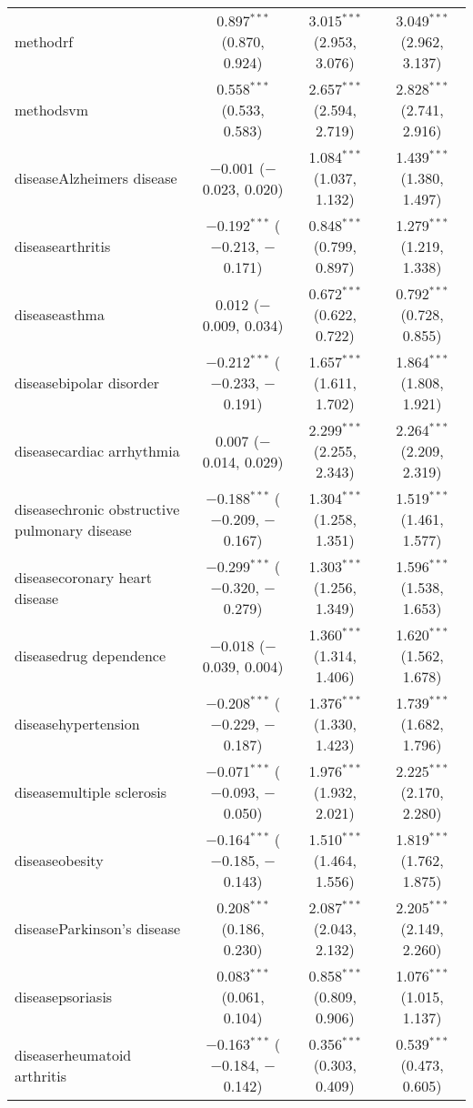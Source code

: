 \begin{table}[!htbp]
\begin{tabular}{@{\extracolsep{5pt}}lccc}
  methodrf & 0.897$^{***}$ (0.870, 0.924) & 3.015$^{***}$ (2.953, 3.076) & 3.049$^{***}$ (2.962, 3.137) \\ 
  methodsvm & 0.558$^{***}$ (0.533, 0.583) & 2.657$^{***}$ (2.594, 2.719) & 2.828$^{***}$ (2.741, 2.916) \\ 
  diseaseAlzheimers disease & $-$0.001 ($-$0.023, 0.020) & 1.084$^{***}$ (1.037, 1.132) & 1.439$^{***}$ (1.380, 1.497) \\ 
  diseasearthritis & $-$0.192$^{***}$ ($-$0.213, $-$0.171) & 0.848$^{***}$ (0.799, 0.897) & 1.279$^{***}$ (1.219, 1.338) \\ 
  diseaseasthma & 0.012 ($-$0.009, 0.034) & 0.672$^{***}$ (0.622, 0.722) & 0.792$^{***}$ (0.728, 0.855) \\ 
  diseasebipolar disorder & $-$0.212$^{***}$ ($-$0.233, $-$0.191) & 1.657$^{***}$ (1.611, 1.702) & 1.864$^{***}$ (1.808, 1.921) \\ 
  diseasecardiac arrhythmia & 0.007 ($-$0.014, 0.029) & 2.299$^{***}$ (2.255, 2.343) & 2.264$^{***}$ (2.209, 2.319) \\ 
  diseasechronic obstructive pulmonary disease & $-$0.188$^{***}$ ($-$0.209, $-$0.167) & 1.304$^{***}$ (1.258, 1.351) & 1.519$^{***}$ (1.461, 1.577) \\ 
  diseasecoronary heart disease & $-$0.299$^{***}$ ($-$0.320, $-$0.279) & 1.303$^{***}$ (1.256, 1.349) & 1.596$^{***}$ (1.538, 1.653) \\ 
  diseasedrug dependence & $-$0.018 ($-$0.039, 0.004) & 1.360$^{***}$ (1.314, 1.406) & 1.620$^{***}$ (1.562, 1.678) \\ 
  diseasehypertension & $-$0.208$^{***}$ ($-$0.229, $-$0.187) & 1.376$^{***}$ (1.330, 1.423) & 1.739$^{***}$ (1.682, 1.796) \\ 
  diseasemultiple sclerosis & $-$0.071$^{***}$ ($-$0.093, $-$0.050) & 1.976$^{***}$ (1.932, 2.021) & 2.225$^{***}$ (2.170, 2.280) \\ 
  diseaseobesity & $-$0.164$^{***}$ ($-$0.185, $-$0.143) & 1.510$^{***}$ (1.464, 1.556) & 1.819$^{***}$ (1.762, 1.875) \\ 
  diseaseParkinson's disease & 0.208$^{***}$ (0.186, 0.230) & 2.087$^{***}$ (2.043, 2.132) & 2.205$^{***}$ (2.149, 2.260) \\ 
  diseasepsoriasis & 0.083$^{***}$ (0.061, 0.104) & 0.858$^{***}$ (0.809, 0.906) & 1.076$^{***}$ (1.015, 1.137) \\ 
  diseaserheumatoid arthritis & $-$0.163$^{***}$ ($-$0.184, $-$0.142) & 0.356$^{***}$ (0.303, 0.409) & 0.539$^{***}$ (0.473, 0.605) \\ 

\end{tabular}
\end{table}
